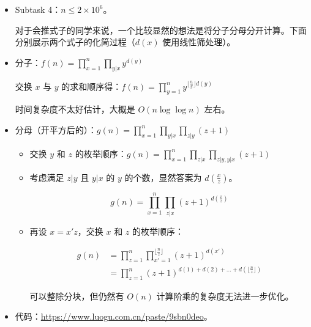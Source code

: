 \documentclass[10pt,aspectratio=43,mathserif]{beamer}
\begin{document}
\begin{frame}

	\begin{itemize} \setlength{\parskip}{0.4\baselineskip}

		\item Subtask 4：$n\leq 2\times 10^6$。

		对于会推式子的同学来说，一个比较显然的想法是将分子分母分开计算。下面分别展示两个式子的化简过程（$d(x)$ 使用线性筛处理）。

		\item 分子：$f(n)=\prod_{x=1}^n\prod_{y|x}y^{d(y)}$

		交换 $x$ 与 $y$ 的求和顺序得：$f(n)=\prod_{y=1}^n y^{\lfloor\frac{n}{y}\rfloor d(y)}$

		时间复杂度不太好估计，大概是 $O(n\log \log n)$ 左右。

	\end{itemize}

\end{frame}

\begin{frame}

	\begin{itemize} \setlength{\parskip}{0.15\baselineskip}

		\item 分母（开平方后的）：$g(n)=\prod_{x=1}^n\prod_{y|x}\prod_{z|y}(z+1)$

		\begin{itemize} 
		
			\item 交换 $y$ 和 $z$ 的枚举顺序：$g(n)=\prod_{x=1}^n\prod_{z|x}\prod_{z|y,y|x}(z+1)$
			
			\item 考虑满足 $z|y$ 且 $y|x$ 的 $y$ 的个数，显然答案为 $d(\frac{x}{z})$。

			$$g(n)=\prod_{x=1}^n\prod_{z|x}(z+1)^{d(\frac xz)}$$

			\item 再设 $x=x'z$，交换 $x$ 和 $z$ 的枚举顺序：

			$$\begin{aligned}g(n)&=\prod_{z=1}^n\prod_{x'=1}^{\lfloor\frac nz\rfloor}(z+1)^{d(x')}\\&=\prod_{z=1}^n(z+1)^{d(1)+d(2)+...+d(\lfloor\frac nz\rfloor)}\end{aligned}$$
			
			可以整除分块，但仍然有 $O(n)$ 计算阶乘的复杂度无法进一步优化。

		\end{itemize}

		\item 代码：\url{https://www.luogu.com.cn/paste/9sbn0deo}。

	\end{itemize}

\end{frame}
\end{document}
